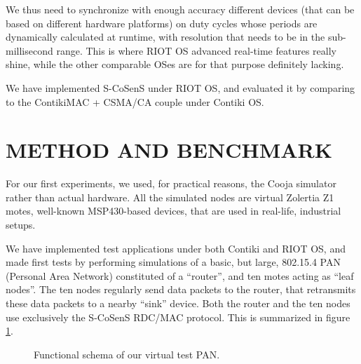 \documentclass[a4paper,twoside]{article}
\begin{document}
We thus need to synchronize with enough accuracy different devices (that
can be based on different hardware platforms) on duty cycles whose periods
are dynamically calculated at runtime, with resolution that needs to be
in the sub-millisecond range. This is where RIOT OS advanced real-time
features really shine, while the other comparable OSes are
for that purpose definitely lacking.

\bigskip

We have implemented S-CoSenS under RIOT OS, and evaluated it by comparing
to the ContikiMAC + CSMA/CA couple under Contiki OS.



\section{\uppercase{Method and Benchmark}}

For our first experiments, we used, for practical reasons, the Cooja
simulator rather than actual hardware. All the simulated nodes are
virtual Zolertia Z1 motes, well-known MSP430-based devices, that are
used in real-life, industrial setups.

We have implemented test applications under both Contiki and RIOT OS, and
made first tests by performing simulations of a basic, but large, 802.15.4
PAN (Personal Area Network) constituted of a ``router'', and ten motes
acting as ``leaf nodes''. The ten nodes regularly send data packets to
the router, that retransmits these data packets to a nearby ``sink'' device.
Both the router and the ten nodes use exclusively the S-CoSenS RDC/MAC
protocol. This is summarized in figure \ref{FigPANtest}.

\begin{figure}[!h]
\centering
{}
\caption{Functional schema of our virtual test PAN.}
\label{FigPANtest}
\end{figure}
\end{document}
